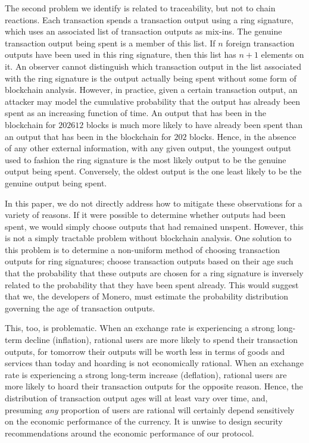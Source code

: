 \documentclass[12pt,english]{mrl}
\theoremstyle{definition}
\numberwithin{equation}{section}
\numberwithin{figure}{section}
\numberwithin{equation}{section}
\numberwithin{equation}{section}
\numberwithin{figure}{section}
\begin{document}
The second problem we identify is related to traceability, but not to chain reactions.  Each transaction spends a transaction output using a ring signature, which uses an associated list of transaction outputs as mix-ins. The genuine transaction output being spent is a member of this list. If $n$ foreign transaction outputs have been used in this ring signature, then this list has $n+1$ elements on it. An observer cannot distinguish which transaction output in the list associated with the ring signature is the output actually being spent without some form of blockchain analysis. However, in practice, given a certain transaction output, an attacker may model the cumulative probability that the output has already been spent as an increasing function of time. An output that has been in the blockchain for $202612$ blocks is much more likely to have already been spent than an output that has been in the blockchain for $202$ blocks. Hence, in the absence of any other external information, with any given output, the youngest output used to fashion the ring signature is the most likely output to be the genuine output being spent. Conversely, the oldest output is the one least likely to be the genuine output being spent. 

In this paper, we do not directly address how to mitigate these observations for a variety of reasons. If it were possible to determine whether outputs had been spent, we would simply choose outputs that had remained unspent. However, this is not a simply tractable problem without blockchain analysis. One solution to this problem is to determine a non-uniform method of choosing transaction outputs for ring signatures; choose transaction outputs based on their age such that the probability that these outputs are chosen for a ring signature is inversely related to the probability that they have been spent already. This would suggest that we, the developers of Monero, must estimate the probability distribution governing the age of transaction outputs. 

This, too, is problematic. When an exchange rate is experiencing a strong long-term decline (inflation), rational users are more likely to spend their transaction outputs, for tomorrow their outputs will be worth less in terms of goods and services than today and hoarding is not economically rational. When an exchange rate is experiencing a strong long-term increase (deflation), rational users are more likely to hoard their transaction outputs for the opposite reason. Hence, the distribution of transaction output ages will at least vary over time, and, presuming \textit{any} proportion of users are rational will certainly depend sensitively on the economic performance of the currency. It is unwise to design security recommendations around the economic performance of our protocol. 
\end{document}
